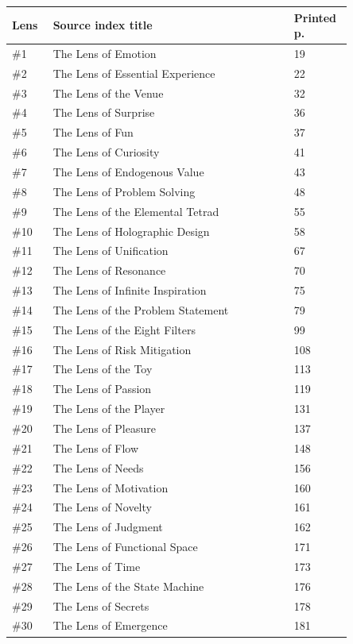 \documentclass[11pt]{article}
\begin{document}
\small\begin{longtable}{@{}p{0.10\linewidth}p{0.63\linewidth}p{0.12\linewidth}@{}}\toprule
Lens & Source index title & Printed p.\\\midrule\endhead
\#1 & The Lens of Emotion & 19 \\
\#2 & The Lens of Essential Experience & 22 \\
\#3 & The Lens of the Venue & 32 \\
\#4 & The Lens of Surprise & 36 \\
\#5 & The Lens of Fun & 37 \\
\#6 & The Lens of Curiosity & 41 \\
\#7 & The Lens of Endogenous Value & 43 \\
\#8 & The Lens of Problem Solving & 48 \\
\#9 & The Lens of the Elemental Tetrad & 55 \\
\#10 & The Lens of Holographic Design & 58 \\
\#11 & The Lens of Unification & 67 \\
\#12 & The Lens of Resonance & 70 \\
\#13 & The Lens of Infinite Inspiration & 75 \\
\#14 & The Lens of the Problem Statement & 79 \\
\#15 & The Lens of the Eight Filters & 99 \\
\#16 & The Lens of Risk Mitigation & 108 \\
\#17 & The Lens of the Toy & 113 \\
\#18 & The Lens of Passion & 119 \\
\#19 & The Lens of the Player & 131 \\
\#20 & The Lens of Pleasure & 137 \\
\#21 & The Lens of Flow & 148 \\
\#22 & The Lens of Needs & 156 \\
\#23 & The Lens of Motivation & 160 \\
\#24 & The Lens of Novelty & 161 \\
\#25 & The Lens of Judgment & 162 \\
\#26 & The Lens of Functional Space & 171 \\
\#27 & The Lens of Time & 173 \\
\#28 & The Lens of the State Machine & 176 \\
\#29 & The Lens of Secrets & 178 \\
\#30 & The Lens of Emergence & 181 \\

\end{longtable}
\end{document}
